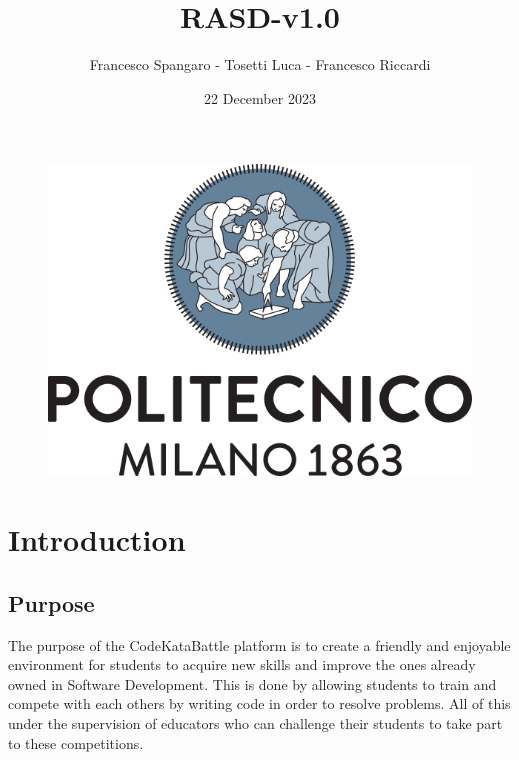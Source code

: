 \documentclass{article}
\title{RASD-v1.0}
\author{Francesco Spangaro - Tosetti Luca - Francesco Riccardi}
\date{22 December 2023}
\begin{document}
\maketitle

\begin{figure}[h]
    \centering
    \includegraphics[scale=0.5]{politecnico-di-milano-logo.png}
\end{figure}



\tableofcontents

\newpage

\pagestyle{IntroductionStyle}

\section{Introduction}
\subsection{Purpose}
The purpose of the CodeKataBattle platform is to create a friendly and enjoyable environment for students
to acquire new skills and improve the ones already owned in Software Development. This is done by allowing students to train and compete with each others by writing code in order to resolve problems. All of this under the supervision of educators who can challenge their students to take part to these competitions.
\end{document}
